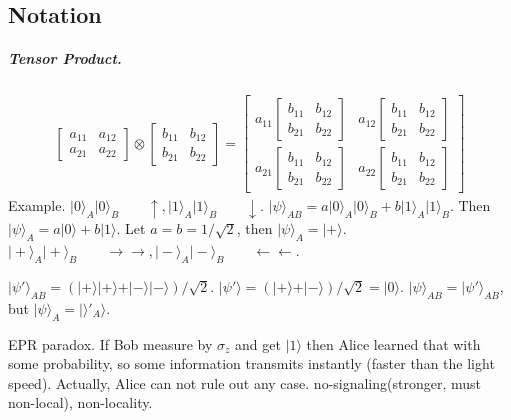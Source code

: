 \documentclass{article}
\begin{document}
\begin{CJK}{UTF8}{gkai}
\begin{spacing}{1.2}
\subsection{Notation}
\subparagraph{Tensor Product.}
\begin{gather*}
\left[\begin{array}{cc} a_{11} & a_{12} \\ a_{21}& a_{22}\end{array}\right] \otimes \left[\begin{array}{cc} b_{11} & b_{12}\\ b_{21}& b_{22} \end{array}\right] =
\left[\begin{array}{cc} a_{11} \left[\begin{array}{cc} b_{11} & b_{12}\\ b_{21}& b_{22} \end{array}\right]  & a_{12} \left[\begin{array}{cc} b_{11} & b_{12}\\ b_{21}& b_{22} \end{array}\right]  \\ a_{21}  \left[\begin{array}{cc} b_{11} & b_{12}\\ b_{21}& b_{22} \end{array}\right]  & a_{22}  \left[\begin{array}{cc} b_{11} & b_{12}\\ b_{21}& b_{22} \end{array}\right] \end{array}\right] 
\end{gather*}
Example. $\vert 0\rangle_A \vert 0\rangle_B\qquad \uparrow, \vert 1\rangle_A \vert 1\rangle_B\qquad \downarrow$. $\vert \psi\rangle_{AB} = a\vert 0\rangle_A \vert 0\rangle_B + b\vert 1\rangle_A \vert 1\rangle_B$. Then $\vert \psi\rangle_A = a\vert 0\rangle + b\vert 1\rangle$. Let $a = b = 1/\sqrt2$, then $\vert\psi\rangle_A = \vert +\rangle$.\\
$\vert+\rangle_A\vert +\rangle_B\qquad \rightarrow\rightarrow, \vert -\rangle_A \vert -\rangle_B\qquad \leftarrow \leftarrow$.

$\vert \psi'\rangle_{AB} = (\vert +\rangle\vert +\rangle + \vert -\rangle \vert -\rangle)/\sqrt{2}$. $\vert\psi'\rangle = (\vert +\rangle + \vert -\rangle)/\sqrt2 = \vert 0\rangle$. 
$\vert \psi\rangle_{AB} = \vert \psi'\rangle_{AB}$, but $\vert \psi\rangle_A = \vert\rangle'_A\rangle$.

EPR paradox. If Bob measure by $\sigma_z$ and get $\vert 1\rangle$ then Alice learned that with some probability, so some information transmits instantly (faster than the light speed). Actually, Alice can not rule out any case. no-signaling(stronger, must non-local), non-locality. 


\end{spacing}
\end{CJK}
\end{document}
